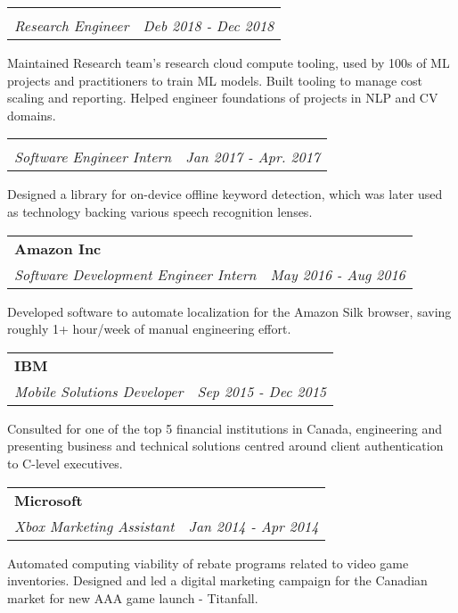 \documentclass[a4paper,20pt]{article}
\makeatletter
\newcommand{\resumeSubheading}[4]{
  \vspace{-1pt}\item
    \begin{tabular*}{0.97\textwidth}{l@{\extracolsep{\fill}}r}
      \textbf{#1} & #2 \\
      \textit{#3} & \textit{#4} \\
    \end{tabular*}\vspace{-5pt}
}
\makeatother
\begin{document}
    \leftskip=0pt

  \vspace{-10pt}
  \resumeSubheading{}{}
  {Research Engineer}{Deb 2018 - Dec 2018}
  \vspace{5pt}

    \leftskip=10pt

    Maintained Research team's research cloud compute tooling, used by 100s of ML projects and practitioners to train ML models. Built tooling to manage cost scaling and reporting. Helped engineer foundations of projects in NLP and CV domains.
    
    \leftskip=0pt


\vspace{-10pt}
\resumeSubheading{}{}
{Software Engineer Intern}{Jan 2017 - Apr. 2017}
\vspace{5pt}

    \leftskip=10pt

    Designed a library for on-device offline keyword detection, which was later used as technology backing various speech recognition lenses.
    
    \leftskip=0pt

\resumeSubheading{Amazon Inc}{}
{Software Development Engineer Intern}{May 2016 - Aug 2016}
\vspace{5pt}

    \leftskip=10pt

    Developed software to automate localization for the Amazon Silk browser, saving roughly 1+ hour/week of manual engineering effort.
    
    \leftskip=0pt

\resumeSubheading{IBM}{}
{Mobile Solutions Developer}{Sep 2015 - Dec 2015}
\vspace{5pt}

    \leftskip=10pt

    Consulted for one of the top 5 financial institutions in Canada, engineering and presenting business and technical solutions centred around client authentication to C-level executives. 
     
    \leftskip=0pt

\resumeSubheading{Microsoft}{}
{Xbox Marketing Assistant}{Jan 2014 - Apr 2014}
\vspace{5pt}
     
    \leftskip=10pt

    Automated computing viability of rebate programs related to video game inventories. Designed and led a digital marketing campaign for the Canadian market for new AAA game launch - Titanfall.
\end{document}
